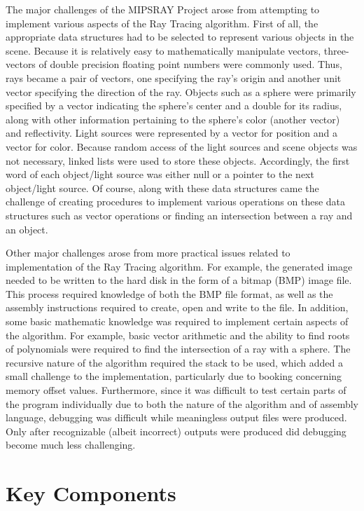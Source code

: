\documentclass[10pt]{article}
\begin{document}
The major challenges of the MIPSRAY Project arose from attempting to
implement various aspects of the Ray Tracing algorithm. First of all,
the appropriate data structures had to be selected to represent various
objects in the scene. Because it is relatively easy to mathematically
manipulate vectors, three-vectors of double precision floating point
numbers were commonly used. Thus, rays became a pair of vectors, one
specifying the ray's origin and another unit vector specifying the
direction of the ray. Objects such as a sphere were primarily specified
by a vector indicating the sphere's center and a double for its radius,
along with other information pertaining to the sphere's color (another
vector) and reflectivity. Light sources were represented by a vector
for position and a vector for color. Because random access of the light
sources and scene objects was not necessary, linked lists were used to
store these objects. Accordingly, the first word of each object/light
source was either null or a pointer to the next object/light source. Of
course, along with these data structures came the challenge of creating
procedures to implement various operations on these data structures such
as vector operations or finding an intersection between a ray and an
object.

Other major challenges arose from more practical issues related to
implementation of the Ray Tracing algorithm. For example, the generated
image needed to be written to the hard disk in the form of a bitmap
(BMP) image file. This process required knowledge of both the BMP file
format, as well as the assembly instructions required to create, open
and write to the file. In addition, some basic mathematic knowledge was
required to implement certain aspects of the algorithm. For example,
basic vector arithmetic and the ability to find roots of polynomials
were required to find the intersection of a ray with a sphere. The
recursive nature of the algorithm required the stack to be used, which
added a small challenge to the implementation, particularly due to
booking concerning memory offset values. Furthermore, since it was
difficult to test certain parts of the program individually due to
both the nature of the algorithm and of assembly language, debugging
was difficult while meaningless output files were produced. Only after
recognizable (albeit incorrect) outputs were produced did debugging
become much less challenging.

\section{Key Components}
\end{document}
